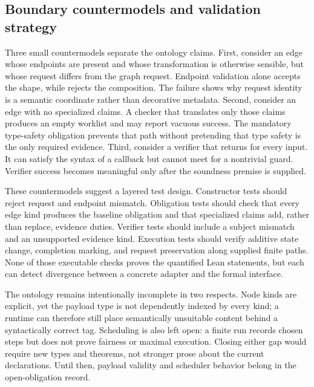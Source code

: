 \subsection{Boundary countermodels and validation strategy}

Three small countermodels separate the ontology claims. First, consider an edge whose endpoints are present and whose transformation is otherwise sensible, but whose request differs from the graph request. Endpoint validation alone accepts the shape, while  rejects the composition. The failure shows why request identity is a semantic coordinate rather than decorative metadata. Second, consider an edge with no specialized claims. A checker that translates only those claims produces an empty worklist and may report vacuous success. The mandatory type-safety obligation prevents that path without pretending that type safety is the only required evidence. Third, consider a verifier that returns \true{} for every input. It can satisfy the syntax of a callback but cannot meet  for a nontrivial guard. Verifier success becomes meaningful only after the soundness premise is supplied.

These countermodels suggest a layered test design. Constructor tests should reject request and endpoint mismatch. Obligation tests should check that every edge kind produces the baseline obligation and that specialized claims add, rather than replace, evidence duties. Verifier tests should include a subject mismatch and an unsupported evidence kind. Execution tests should verify additive state change, completion marking, and request preservation along supplied finite paths. None of those executable checks proves the quantified Lean statements, but each can detect divergence between a concrete adapter and the formal interface.

The ontology remains intentionally incomplete in two respects. Node kinds are explicit, yet the payload type is not dependently indexed by every kind; a runtime can therefore still place semantically unsuitable content behind a syntactically correct tag. Scheduling is also left open: a finite run records chosen steps but does not prove fairness or maximal execution. Closing either gap would require new types and theorems, not stronger prose about the current declarations. Until then, payload validity and scheduler behavior belong in the open-obligation record.

